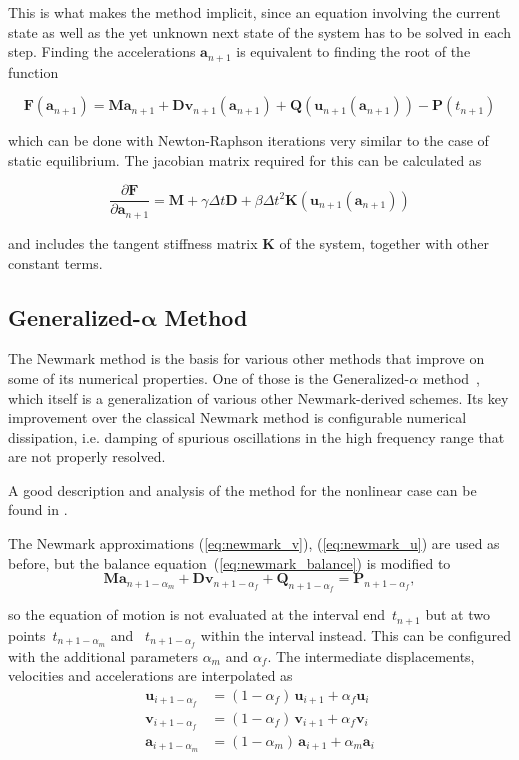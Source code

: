 This is what makes the method implicit, since an equation involving the current state as well as the yet unknown next state of the system has to be solved in each step.
Finding the accelerations $\boldsymbol{a}_{n+1}$ is equivalent to finding the root of the function

$$
\boldsymbol{F}(\boldsymbol{a}_{n+1}) = \boldsymbol{M}\boldsymbol{a}_{n+1} + \boldsymbol{D}\mathbf{v}_{n+1}(\boldsymbol{a}_{n+1}) + \boldsymbol{Q}(\boldsymbol{u}_{n+1}(\boldsymbol{a}_{n+1})) - \boldsymbol{P}(t_{n+1})
$$

which can be done with Newton-Raphson iterations very similar to the case of static equilibrium.
The jacobian matrix required for this can be calculated as

$$
\frac{\partial \boldsymbol{F}}{\partial \boldsymbol{a}_{n+1}} = \boldsymbol{M} + \gamma \Delta t \boldsymbol{D} + \beta \Delta t^2 \boldsymbol{K}(\boldsymbol{u}_{n+1}(\boldsymbol{a}_{n+1}))
$$

and includes the tangent stiffness matrix $\boldsymbol{K}$ of the system, together with other constant terms.


\subsection{Generalized-$\boldsymbol{\alpha}$ Method}

The Newmark method is the basis for various other methods that improve on some of its numerical properties.
One of those is the Generalized-$\alpha$ method~\cite{bib:chung1993}, which itself is a generalization of various other Newmark-derived schemes.
Its key improvement over the classical Newmark method is configurable numerical dissipation, i.e. damping of spurious oscillations in the high frequency range that are not properly resolved.

A good description and analysis of the method for the nonlinear case can be found in \cite{bib:erlicher2002}.

The Newmark approximations (\ref{eq:newmark_v}), (\ref{eq:newmark_u}) are used as before, but the balance equation~(\ref{eq:newmark_balance}) is modified to
%
\begin{equation}
\boldsymbol{M}\boldsymbol{a}_{n+1-\alpha_m} + \boldsymbol{D}\mathbf{v}_{n+1-\alpha_f} + \boldsymbol{Q}_{n+1-\alpha_f} = \boldsymbol{P}_{n+1-\alpha_f},
\end{equation}

so the equation of motion is not evaluated at the interval end~$t_{n+1}$ but at two points~$t_{n+1-\alpha_m}$ and~ $t_{n+1-\alpha_f}$ within the interval instead.
This can be configured with the additional parameters $\alpha_{m}$ and $\alpha_{f}$.
The intermediate displacements, velocities and accelerations are interpolated as
%
\begin{align}
\boldsymbol{u}_{i+1-\alpha_f} &= (1 - \alpha_f)\,\boldsymbol{u}_{i+1} + \alpha_f\boldsymbol{u}_{i} \\
\mathbf{v}_{i+1-\alpha_f} &= (1 - \alpha_f)\,\mathbf{v}_{i+1} + \alpha_f\mathbf{v}_{i} \\
\boldsymbol{a}_{i+1-\alpha_m} &= (1 - \alpha_m)\,\boldsymbol{a}_{i+1} + \alpha_m\boldsymbol{a}_{i}
\end{align}

